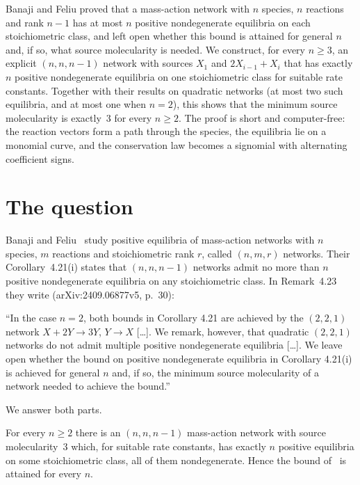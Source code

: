 \documentclass[11pt,a4paper]{report}
\begin{document}
\makepapertitle

\begin{paperabstract}
Banaji and Feliu proved that a mass-action network with \(n\) species, \(n\) reactions and rank \(n-1\) has at
most \(n\) positive nondegenerate equilibria on each stoichiometric class, and left open whether this bound is
attained for general \(n\) and, if so, what source molecularity is needed. We construct, for every \(n\ge3\), an
explicit \((n,n,n-1)\) network with sources \(X_1\) and \(2X_{i-1}+X_i\) that has exactly \(n\) positive
nondegenerate equilibria on one stoichiometric class for suitable rate constants. Together with their results on
quadratic networks (at most two such equilibria, and at most one when \(n=2\)), this shows that the minimum source
molecularity is exactly~3 for every \(n\ge2\). The proof is short and computer-free: the reaction vectors form a path through the species, the
equilibria lie on a monomial curve, and the conservation law becomes a signomial with alternating coefficient signs.
\end{paperabstract}

\section*{The question}

Banaji and Feliu~\autocite{BanajiFeliu2026} study positive equilibria of mass-action networks with \(n\) species,
\(m\) reactions and stoichiometric rank \(r\), called \((n,m,r)\) networks. Their Corollary~4.21(i) states that
\((n,n,n-1)\) networks admit no more than \(n\) positive nondegenerate equilibria on any stoichiometric class. In
Remark~4.23 they write (arXiv:2409.06877v5, p.~30):

\begin{openquote}
``In the case \(n = 2\), both bounds in Corollary 4.21 are achieved by the \((2, 2, 1)\) network
\(X + 2Y \to 3Y\), \(Y \to X\) [\dots]. We remark, however, that quadratic \((2, 2, 1)\) networks do not admit
multiple positive nondegenerate equilibria [\dots]. We leave open whether the bound on positive nondegenerate
equilibria in Corollary 4.21(i) is achieved for general \(n\) and, if so, the minimum source molecularity of a
network needed to achieve the bound.''
\end{openquote}

We answer both parts.

\begin{theorem}\label{thm:A}
For every \(n\ge 2\) there is an \((n,n,n-1)\) mass-action network with source molecularity~3 which, for suitable
rate constants, has exactly \(n\) positive equilibria on some stoichiometric class, all of them nondegenerate.
Hence the bound of~\autocite[Corollary~4.21(i)]{BanajiFeliu2026} is attained for every \(n\).
\end{theorem}
\end{document}
